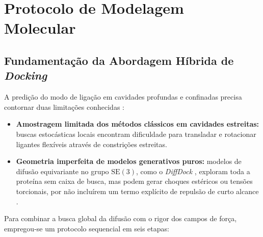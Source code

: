 \section{Protocolo de Modelagem Molecular} \label{section: methodology}

\subsection{Fundamentação da Abordagem Híbrida de \textit{Docking}}

A predição do modo de ligação em cavidades profundas e confinadas precisa contornar duas limitações conhecidas \cite{Buttenschoen2024PoseBusters, McNutt2025GNINA13}:
\begin{itemize}
    \item \textbf{Amostragem limitada dos métodos clássicos em cavidades estreitas:} buscas estocásticas locais encontram dificuldade para transladar e rotacionar ligantes flexíveis através de constrições estreitas.
    \item \textbf{Geometria imperfeita de modelos generativos puros:} modelos de difusão equivariante no grupo $\text{SE}(3)$, como o \textit{DiffDock} \cite{Corso2023DiffDock, Corso2024DiffDockL}, exploram toda a proteína sem caixa de busca, mas podem gerar choques estéricos ou tensões torcionais, por não incluírem um termo explícito de repulsão de curto alcance \cite{Buttenschoen2024PoseBusters}.
\end{itemize}

Para combinar a busca global da difusão com o rigor dos campos de força, empregou-se um protocolo sequencial em seis etapas:

